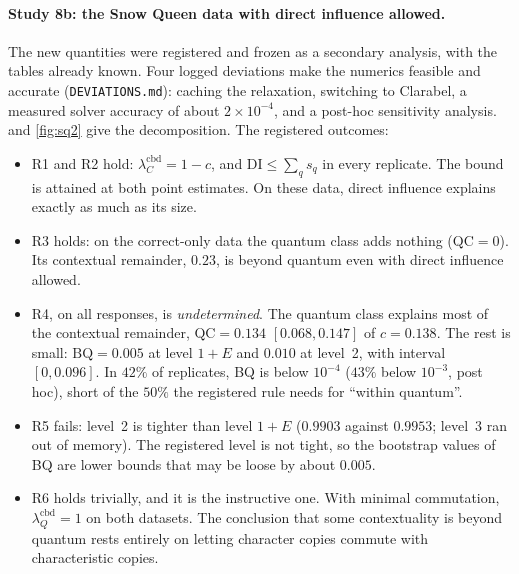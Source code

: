 \documentclass[11pt]{article}
\theoremstyle{definition}\newtheorem{definition}[theorem]{Definition}\newtheorem{remark}[theorem]{Remark}\newtheorem{example}[theorem]{Example}
\begin{document}
\paragraph{Study 8b: the Snow Queen data with direct influence allowed.}
The new quantities were registered and frozen as a secondary analysis, with the tables already known. Four logged deviations make the
numerics feasible and accurate (\texttt{DEVIATIONS.md}): caching the relaxation, switching to Clarabel, a measured solver accuracy of
about $2\times10^{-4}$, and a post-hoc sensitivity analysis.  and \cref{fig:sq2} give the decomposition. The registered
outcomes:
\begin{itemize}
\item R1 and R2 hold: $\lambda_C^{\mathrm{cbd}}=1-c$, and $\mathrm{DI}\le\sum_qs_q$ in every replicate. The bound is attained at both point
  estimates. On these data, direct influence explains exactly as much as its size.
\item R3 holds: on the correct-only data the quantum class adds nothing ($\mathrm{QC}=0$). Its contextual remainder, $0.23$, is beyond
  quantum even with direct influence allowed.
\item R4, on all responses, is \emph{undetermined}. The quantum class explains most of the contextual remainder, $\mathrm{QC}=0.134$
  $[0.068,0.147]$ of $c=0.138$. The rest is small: $\mathrm{BQ}=0.005$ at level $1{+}E$ and $0.010$ at level~2, with interval $[0,0.096]$.
  In $42\%$ of replicates, BQ is below $10^{-4}$ ($43\%$ below $10^{-3}$, post hoc), short of the $50\%$ the registered rule needs for
  ``within quantum''.
\item R5 fails: level~2 is tighter than level $1{+}E$ ($0.9903$ against $0.9953$; level~3 ran out of memory). The registered level is
  not tight, so the bootstrap values of BQ are lower bounds that may be loose by about $0.005$.
\item R6 holds trivially, and it is the instructive one. With minimal commutation, $\lambda_Q^{\mathrm{cbd}}=1$ on both datasets. The
  conclusion that some contextuality is beyond quantum rests entirely on letting character copies commute with characteristic copies.
\end{itemize}
\end{document}
